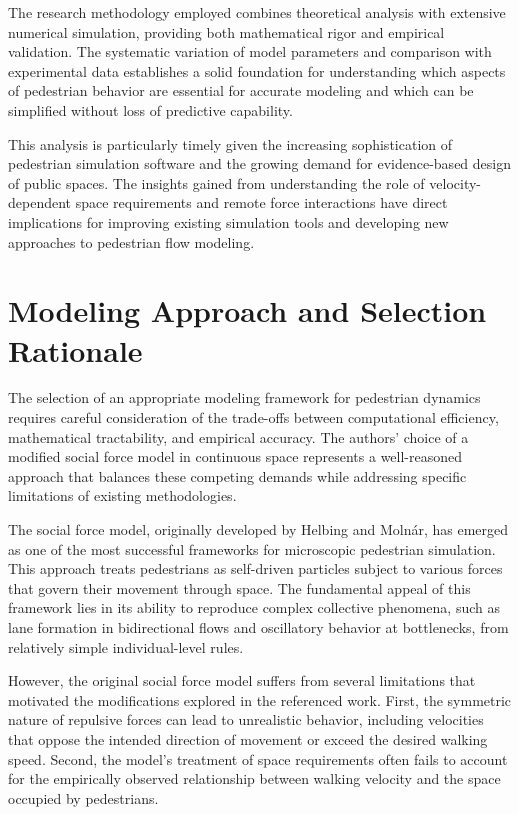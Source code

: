 \documentclass[12pt,a4paper]{article}
\begin{document}
The research methodology employed combines theoretical analysis with extensive numerical simulation, providing both mathematical rigor and empirical validation. The systematic variation of model parameters and comparison with experimental data establishes a solid foundation for understanding which aspects of pedestrian behavior are essential for accurate modeling and which can be simplified without loss of predictive capability.

This analysis is particularly timely given the increasing sophistication of pedestrian simulation software and the growing demand for evidence-based design of public spaces. The insights gained from understanding the role of velocity-dependent space requirements and remote force interactions have direct implications for improving existing simulation tools and developing new approaches to pedestrian flow modeling.

\section{Modeling Approach and Selection Rationale}

The selection of an appropriate modeling framework for pedestrian dynamics requires careful consideration of the trade-offs between computational efficiency, mathematical tractability, and empirical accuracy. The authors' choice of a modified social force model in continuous space represents a well-reasoned approach that balances these competing demands while addressing specific limitations of existing methodologies.

The social force model, originally developed by Helbing and Molnár, has emerged as one of the most successful frameworks for microscopic pedestrian simulation. This approach treats pedestrians as self-driven particles subject to various forces that govern their movement through space. The fundamental appeal of this framework lies in its ability to reproduce complex collective phenomena, such as lane formation in bidirectional flows and oscillatory behavior at bottlenecks, from relatively simple individual-level rules.

However, the original social force model suffers from several limitations that motivated the modifications explored in the referenced work. First, the symmetric nature of repulsive forces can lead to unrealistic behavior, including velocities that oppose the intended direction of movement or exceed the desired walking speed. Second, the model's treatment of space requirements often fails to account for the empirically observed relationship between walking velocity and the space occupied by pedestrians.
\end{document}
